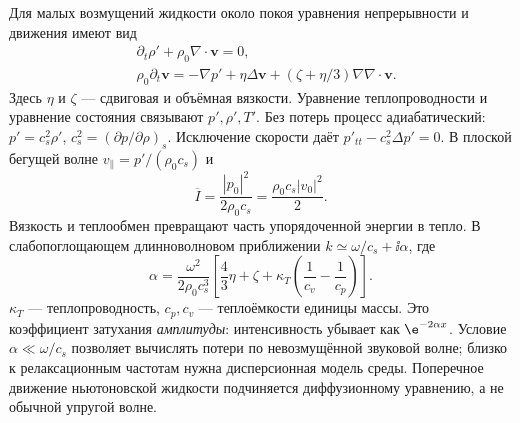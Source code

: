 
Для малых возмущений жидкости около покоя уравнения непрерывности и движения имеют вид
\begin{align}
 &\partial_t\rho'+\rho_0\nabla\cdot\bm v=0,\\
 &\rho_0\partial_t\bm v=-\nabla p'+\eta\Delta\bm v+
 (\zeta+\eta/3)\nabla\nabla\cdot\bm v.
\end{align}
Здесь $\eta$ и $\zeta$ — сдвиговая и объёмная вязкости. Уравнение теплопроводности и уравнение состояния связывают $p',\rho',T'$. Без потерь процесс адиабатический: $p'=c_s^2\rho'$, $c_s^2=(\partial p/\partial\rho)_s$. Исключение скорости даёт $p'_{tt}-c_s^2\Delta p'=0$. В плоской бегущей волне $v_\parallel=p'/(\rho_0c_s)$ и
\begin{equation}
 \overline I=\frac{|p_0|^2}{2\rho_0c_s}=\frac{\rho_0c_s|v_0|^2}{2}.
\end{equation}
Вязкость и теплообмен превращают часть упорядоченной энергии в тепло. В слабопоглощающем длинноволновом приближении $k\simeq\omega/c_s+\ii\alpha$, где
\begin{equation}
 \alpha=\frac{\omega^2}{2\rho_0c_s^3}
 \left[\frac43\eta+\zeta+\kappa_T\left(\frac1{c_v}-\frac1{c_p}\right)\right].
\end{equation}
$\kappa_T$ — теплопроводность, $c_p,c_v$ — теплоёмкости единицы массы. Это коэффициент затухания \emph{амплитуды}: интенсивность убывает как $\e^{-2\alpha x}$. Условие $\alpha\ll\omega/c_s$ позволяет вычислять потери по невозмущённой звуковой волне; близко к релаксационным частотам нужна дисперсионная модель среды. Поперечное движение ньютоновской жидкости подчиняется диффузионному уравнению, а не обычной упругой волне.


